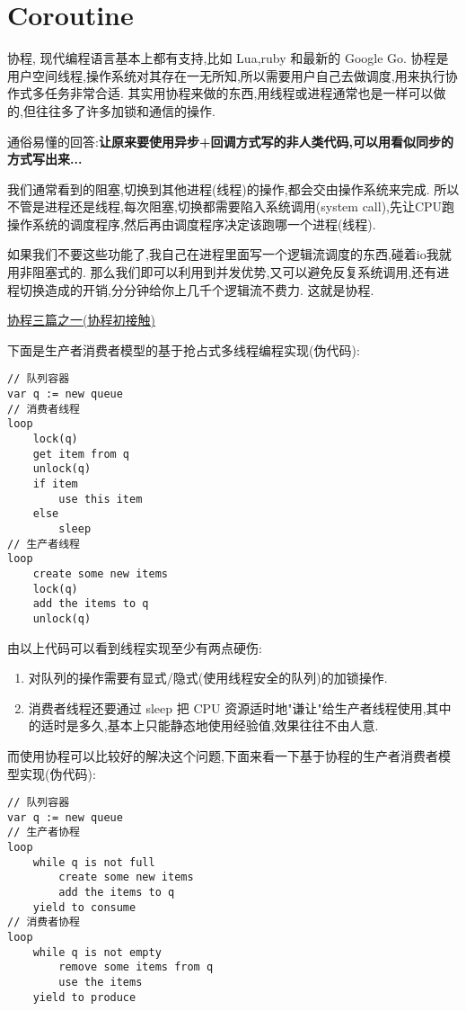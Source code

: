 \section{Coroutine}
协程, 现代编程语言基本上都有支持,比如 Lua,ruby 和最新的 Google Go.
协程是用户空间线程,操作系统对其存在一无所知,所以需要用户自己去做调度,用来执行协作式多任务非常合适.
其实用协程来做的东西,用线程或进程通常也是一样可以做的,但往往多了许多加锁和通信的操作.

通俗易懂的回答:\textbf{让原来要使用异步+回调方式写的非人类代码,可以用看似同步的方式写出来...}

我们通常看到的阻塞,切换到其他进程(线程)的操作,都会交由操作系统来完成.
所以不管是进程还是线程,每次阻塞,切换都需要陷入系统调用(system call),先让CPU跑操作系统的调度程序,然后再由调度程序决定该跑哪一个进程(线程).

如果我们不要这些功能了,我自己在进程里面写一个逻辑流调度的东西,碰着io我就用非阻塞式的.
那么我们即可以利用到并发优势,又可以避免反复系统调用,还有进程切换造成的开销,分分钟给你上几千个逻辑流不费力.
这就是协程.


\href{http://blog.csdn.net/gzlaiyonghao/article/details/5397038}{协程三篇之一(协程初接触)}

下面是生产者消费者模型的基于抢占式多线程编程实现(伪代码):
\begin{verbatim}
// 队列容器
var q := new queue
// 消费者线程
loop
    lock(q)
    get item from q
    unlock(q)
    if item
        use this item
    else
        sleep 
// 生产者线程
loop
    create some new items
    lock(q)
    add the items to q
    unlock(q)
\end{verbatim}

由以上代码可以看到线程实现至少有两点硬伤:
\begin{enumerate}
\item 对队列的操作需要有显式/隐式(使用线程安全的队列)的加锁操作.
\item 消费者线程还要通过 sleep 把 CPU 资源适时地"谦让"给生产者线程使用,其中的适时是多久,基本上只能静态地使用经验值,效果往往不由人意.
\end{enumerate}

而使用协程可以比较好的解决这个问题,下面来看一下基于协程的生产者消费者模型实现(伪代码):
\begin{verbatim}
// 队列容器
var q := new queue
// 生产者协程
loop
    while q is not full
        create some new items
        add the items to q
    yield to consume
// 消费者协程
loop
    while q is not empty
        remove some items from q
        use the items
    yield to produce
\end{verbatim}

